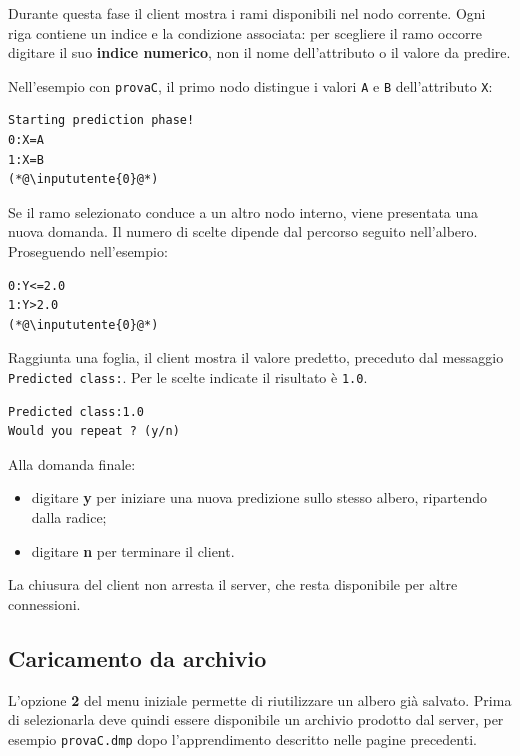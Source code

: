 \documentclass[11pt,a4paper]{article}
\begin{document}
Durante questa fase il client mostra i rami disponibili nel nodo corrente.
Ogni riga contiene un indice e la condizione associata: per scegliere il ramo
occorre digitare il suo \textbf{indice numerico}, non il nome dell'attributo
o il valore da predire.

Nell'esempio con \texttt{provaC}, il primo nodo distingue i valori
\texttt{A} e \texttt{B} dell'attributo \texttt{X}:

\begin{lstlisting}
Starting prediction phase!
0:X=A
1:X=B
(*@\inpututente{0}@*)
\end{lstlisting}

Se il ramo selezionato conduce a un altro nodo interno, viene presentata una
nuova domanda. Il numero di scelte dipende dal percorso seguito nell'albero.
Proseguendo nell'esempio:

\begin{lstlisting}
0:Y<=2.0
1:Y>2.0
(*@\inpututente{0}@*)
\end{lstlisting}

Raggiunta una foglia, il client mostra il valore predetto, preceduto dal
messaggio \texttt{Predicted class:}. Per le scelte indicate il risultato è
\texttt{1.0}.

\begin{lstlisting}
Predicted class:1.0
Would you repeat ? (y/n)
\end{lstlisting}

Alla domanda finale:
\begin{itemize}
  \item digitare \textbf{y} per iniziare una nuova predizione sullo stesso
        albero, ripartendo dalla radice;
  \item digitare \textbf{n} per terminare il client.
\end{itemize}

La chiusura del client non arresta il server, che resta disponibile per altre
connessioni.

\clearpage
\subsection*{Caricamento da archivio}

L'opzione \textbf{2} del menu iniziale permette di riutilizzare un albero già
salvato. Prima di selezionarla deve quindi essere disponibile un archivio
prodotto dal server, per esempio \texttt{provaC.dmp} dopo l'apprendimento
descritto nelle pagine precedenti.
\end{document}
